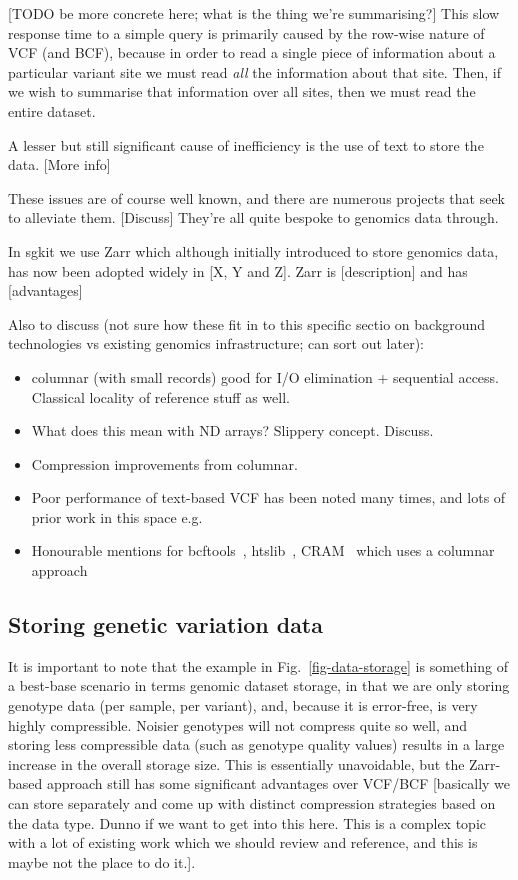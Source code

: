 \documentclass[a4paper,num-refs]{oup-contemporary}
\begin{document}
[TODO be more concrete here; what is the thing we're summarising?]
This slow response time to a simple query is primarily caused by the row-wise
nature of VCF (and BCF), because in order to read a single piece of
information about a particular variant site we must read \emph{all}
the information
about that site. Then, if we wish to summarise that information over
all sites, then we must read the entire dataset.

A lesser but still significant cause of inefficiency is the use of
text to store the data. [More info]

These issues are of course well known, and there are numerous projects
that seek to alleviate them. [Discuss] They're all quite bespoke to genomics data
through.

In sgkit we use Zarr which although initially introduced to store
genomics data, has now been adopted widely in [X, Y and Z].
Zarr is [description] and has [advantages]

Also to discuss (not sure how these fit in to this specific sectio
on background technologies vs existing genomics infrastructure; can
sort out later):

\begin{itemize}
\item columnar (with small records) good for I/O elimination + sequential access.
Classical locality of reference stuff as well.
\item What does this mean with ND arrays? Slippery concept. Discuss.
\item Compression improvements from columnar.
\item Poor performance of text-based VCF has been noted many times,
and lots of prior work in this space e.g. \citep{kelleher2013processing}
\item Honourable mentions for bcftools~\citep{danecek2021twelve},
htslib~\citep{bonfield2021htslib}, CRAM~\citep{bonfield2014scramble,bonfield2022cram}
which uses a columnar approach
\end{itemize}


\subsection{Storing genetic variation data}

It is important to note that the example in Fig.~\ref{fig-data-storage}
is something of a best-base
scenario in terms genomic dataset storage, in that we are only
storing genotype data (per sample, per variant),
and, because it is error-free, is very
highly compressible. Noisier genotypes will not compress quite
so well, and storing less compressible data (such as genotype
quality values) results in a large increase in the overall
storage size. This is essentially unavoidable, but the Zarr-based
approach still has some significant advantages over VCF/BCF
[basically we can store separately and come up with distinct
compression strategies based on the data type. Dunno if we
want to get into this here. This is a complex topic with
a lot of existing work which we should review and reference,
and this is maybe not the place to do it.].
\end{document}
